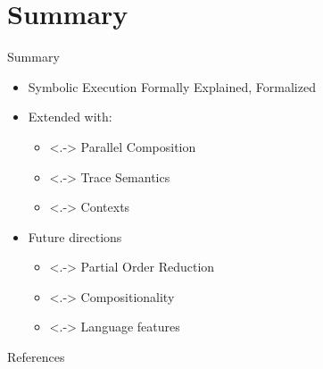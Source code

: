\documentclass{beamer}
\begin{document}
\section{Summary}


\begin{frame}{Summary}
  \begin{itemize}[<+->]
    \item Symbolic Execution Formally Explained, Formalized
    \item Extended with:
          \begin{itemize}
            \item<.-> Parallel Composition
            \item<.-> Trace Semantics
            \item<.-> Contexts
          \end{itemize}
    \item Future directions
          \begin{itemize}
            \item<.-> Partial Order Reduction
            \item<.-> Compositionality
            \item<.-> Language features
          \end{itemize}
  \end{itemize}
  \vfill{}
\end{frame}

\appendix
\begin{frame}{References}
  \printbibliography{}
\end{frame}
\end{document}
